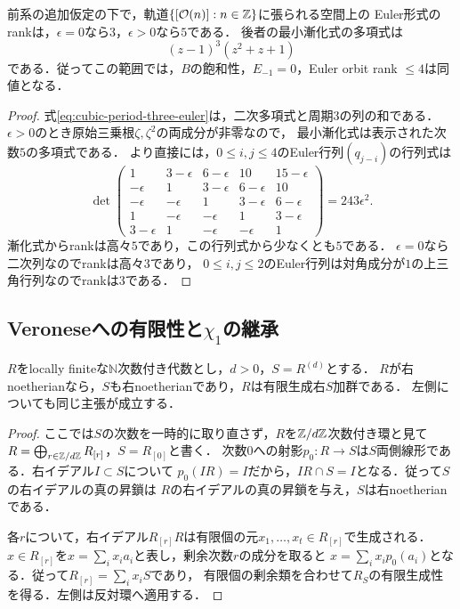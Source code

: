 \documentclass[11pt,a4paper]{ltjsarticle}
\begin{document}
\begin{corollary}\label{cor:cubic-defect-Euler-rank}
前系の追加仮定の下で，軌道$\{[\mathcal O(n)]:n\in\mathbb Z\}$に張られる空間上の
Euler形式のrankは，$\epsilon=0$なら$3$，$\epsilon>0$なら$5$である．
後者の最小漸化式の多項式は
\[
 (z-1)^3(z^2+z+1)
\]
である．従ってこの範囲では，$B$の飽和性，$E_{-1}=0$，Euler orbit rank $\leq4$は同値となる．
\end{corollary}
\begin{proof}
式\eqref{eq:cubic-period-three-euler}は，二次多項式と周期$3$の列の和である．
$\epsilon>0$のとき原始三乗根$\zeta,\zeta^2$の両成分が非零なので，
最小漸化式は表示された次数$5$の多項式である．
より直接には，$0\leq i,j\leq4$のEuler行列$(q_{j-i})$の行列式は
\[
 \det\begin{pmatrix}
 1&3-\epsilon&6-\epsilon&10&15-\epsilon\\
 -\epsilon&1&3-\epsilon&6-\epsilon&10\\
 -\epsilon&-\epsilon&1&3-\epsilon&6-\epsilon\\
 1&-\epsilon&-\epsilon&1&3-\epsilon\\
 3-\epsilon&1&-\epsilon&-\epsilon&1
 \end{pmatrix}
 =243\epsilon^2.
\]
漸化式からrankは高々$5$であり，この行列式から少なくとも$5$である．
$\epsilon=0$なら二次列なのでrankは高々$3$であり，
$0\leq i,j\leq2$のEuler行列は対角成分が$1$の上三角行列なのでrankは$3$である．
\end{proof}

\subsection{Veroneseへの有限性と\texorpdfstring{$\chi_1$}{chi1}の継承}

\begin{lemma}[有限巡回次数による有限拡大]\label{lem:v8-veronese-finite}
$R$をlocally finiteな$\mathbb N$次数付き代数とし，$d>0$，$S=R^{(d)}$とする．
$R$が右noetherianなら，$S$も右noetherianであり，$R$は有限生成右$S$加群である．
左側についても同じ主張が成立する．
\end{lemma}
\begin{proof}
ここでは$S$の次数を一時的に取り直さず，$R$を$\mathbb Z/d\mathbb Z$次数付き環と見て
$R=\bigoplus_{r\in\mathbb Z/d\mathbb Z}R_{[r]}$，$S=R_{[0]}$と書く．
次数$0$への射影$p_0:R\to S$は$S$両側線形である．右イデアル$I\subset S$について
$p_0(IR)=I$だから，$IR\cap S=I$となる．従って$S$の右イデアルの真の昇鎖は
$R$の右イデアルの真の昇鎖を与え，$S$は右noetherianである．

各$r$について，右イデアル$R_{[r]}R$は有限個の元$x_1,\ldots,x_t\in R_{[r]}$で生成される．
$x\in R_{[r]}$を$x=\sum_i x_i a_i$と表し，剰余次数$r$の成分を取ると
$x=\sum_i x_i p_0(a_i)$となる．従って$R_{[r]}=\sum_i x_iS$であり，
有限個の剰余類を合わせて$R_S$の有限生成性を得る．左側は反対環へ適用する．
\end{proof}
\end{document}
